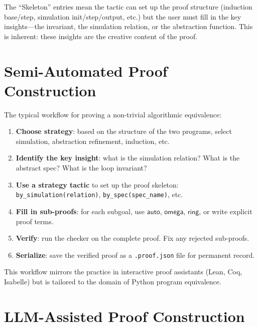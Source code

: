 \begin{remark}
The ``Skeleton'' entries mean the tactic can set up the proof structure
(induction base/step, simulation init/step/output, etc.) but the
user must fill in the key insights---the invariant, the simulation
relation, or the abstraction function.  This is inherent: these
insights are the creative content of the proof.
\end{remark}


\section{Semi-Automated Proof Construction}

The typical workflow for proving a non-trivial algorithmic equivalence:

\begin{enumerate}
\item \textbf{Choose strategy}: based on the structure of the two
  programs, select simulation, abstraction refinement, induction, etc.

\item \textbf{Identify the key insight}: what is the simulation
  relation?  What is the abstract spec?  What is the loop invariant?

\item \textbf{Use a strategy tactic} to set up the proof skeleton:
  \texttt{by\_simulation(relation)}, \texttt{by\_spec(spec\_name)}, etc.

\item \textbf{Fill in sub-proofs}: for each subgoal, use
  $\mathsf{auto}$, $\mathsf{omega}$, $\mathsf{ring}$, or write
  explicit proof terms.

\item \textbf{Verify}: run the checker on the complete proof.  Fix
  any rejected sub-proofs.

\item \textbf{Serialize}: save the verified proof as a
  \texttt{.proof.json} file for permanent record.
\end{enumerate}

This workflow mirrors the practice in interactive proof assistants
(Lean, Coq, Isabelle) but is tailored to the domain of Python
program equivalence.


\section{LLM-Assisted Proof Construction}

